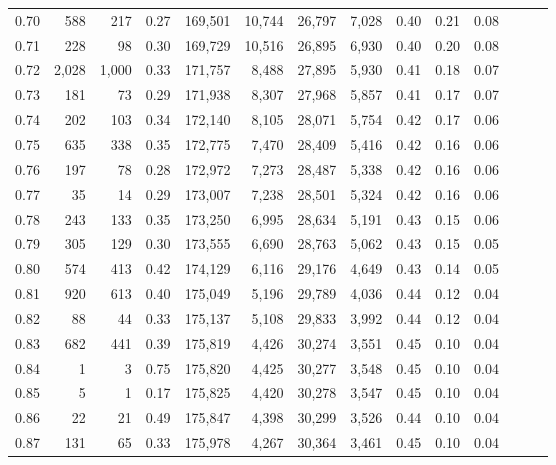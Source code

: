 \begin{tabular}{rrrrrrrrrrrrrr}
0.70 &     588 &    217 &  0.27 &  169,501 &   10,744 &  26,797 &   7,028 &  0.40 &  0.21 &      0.08 \\
0.71 &     228 &     98 &  0.30 &  169,729 &   10,516 &  26,895 &   6,930 &  0.40 &  0.20 &      0.08 \\
0.72 &   2,028 &  1,000 &  0.33 &  171,757 &    8,488 &  27,895 &   5,930 &  0.41 &  0.18 &      0.07 \\
0.73 &     181 &     73 &  0.29 &  171,938 &    8,307 &  27,968 &   5,857 &  0.41 &  0.17 &      0.07 \\
0.74 &     202 &    103 &  0.34 &  172,140 &    8,105 &  28,071 &   5,754 &  0.42 &  0.17 &      0.06 \\
0.75 &     635 &    338 &  0.35 &  172,775 &    7,470 &  28,409 &   5,416 &  0.42 &  0.16 &      0.06 \\
0.76 &     197 &     78 &  0.28 &  172,972 &    7,273 &  28,487 &   5,338 &  0.42 &  0.16 &      0.06 \\
0.77 &      35 &     14 &  0.29 &  173,007 &    7,238 &  28,501 &   5,324 &  0.42 &  0.16 &      0.06 \\
0.78 &     243 &    133 &  0.35 &  173,250 &    6,995 &  28,634 &   5,191 &  0.43 &  0.15 &      0.06 \\
0.79 &     305 &    129 &  0.30 &  173,555 &    6,690 &  28,763 &   5,062 &  0.43 &  0.15 &      0.05 \\
0.80 &     574 &    413 &  0.42 &  174,129 &    6,116 &  29,176 &   4,649 &  0.43 &  0.14 &      0.05 \\
0.81 &     920 &    613 &  0.40 &  175,049 &    5,196 &  29,789 &   4,036 &  0.44 &  0.12 &      0.04 \\
0.82 &      88 &     44 &  0.33 &  175,137 &    5,108 &  29,833 &   3,992 &  0.44 &  0.12 &      0.04 \\
0.83 &     682 &    441 &  0.39 &  175,819 &    4,426 &  30,274 &   3,551 &  0.45 &  0.10 &      0.04 \\
0.84 &       1 &      3 &  0.75 &  175,820 &    4,425 &  30,277 &   3,548 &  0.45 &  0.10 &      0.04 \\
0.85 &       5 &      1 &  0.17 &  175,825 &    4,420 &  30,278 &   3,547 &  0.45 &  0.10 &      0.04 \\
0.86 &      22 &     21 &  0.49 &  175,847 &    4,398 &  30,299 &   3,526 &  0.44 &  0.10 &      0.04 \\
0.87 &     131 &     65 &  0.33 &  175,978 &    4,267 &  30,364 &   3,461 &  0.45 &  0.10 &      0.04 \\

\end{tabular}

